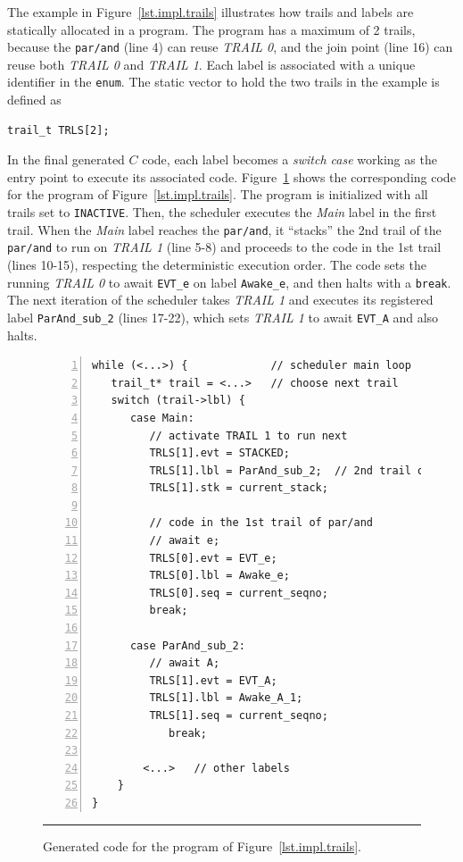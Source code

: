 \documentclass{sigplanconf}
\newcommand{\code}[1] {{\small{\texttt{#1}}}}
\newcommand{\1}{\;}
\newcommand{\2}{\;\;}
\newcommand{\3}{\;\;\;}
\newcommand{\5}{\;\;\;\;\;}
\begin{document}
The example in Figure~\ref{lst.impl.trails} illustrates how trails and labels 
are statically allocated in a program.
%
The program has a maximum of 2 trails, because the \code{par/and} (line 4) can 
reuse \emph{TRAIL 0}, and the join point (line 16) can reuse both \emph{TRAIL 
0} and \emph{TRAIL 1}.
%
Each label is associated with a unique identifier in the \code{enum}.
%
The static vector to hold the two trails in the example is defined as

\begin{lstlisting}
trail_t TRLS[2];
\end{lstlisting}

In the final generated $C$ code, each label becomes a \emph{switch case} 
working as the entry point to execute its associated code.
%
Figure~\ref{lst.impl.code} shows the corresponding code for the program of 
Figure~\ref{lst.impl.trails}.
%
The program is initialized with all trails set to \code{INACTIVE}.
Then, the scheduler executes the \emph{Main} label in the first trail.
%
When the \emph{Main} label reaches the \code{par/and}, it ``stacks'' the 2nd 
trail of the \code{par/and} to run on \emph{TRAIL 1} (line 5-8) and proceeds to 
the code in the 1st trail (lines 10-15), respecting the deterministic execution 
order.
%
The code sets the running \emph{TRAIL 0} to await \code{EVT\_e} on label 
\code{Awake\_e}, and then halts with a \code{break}.
%
The next iteration of the scheduler takes \emph{TRAIL 1} and executes its 
registered label \code{ParAnd\_sub\_2} (lines 17-22), which sets \emph{TRAIL 1} 
to await \code{EVT\_A} and also halts.


\begin{figure}[t]
\begin{lstlisting}[numbers=left,xleftmargin=2em]
while (<...>) {             // scheduler main loop
   trail_t* trail = <...>   // choose next trail
   switch (trail->lbl) {
      case Main:
         // activate TRAIL 1 to run next
         TRLS[1].evt = STACKED;
         TRLS[1].lbl = ParAnd_sub_2;  // 2nd trail of par/and
         TRLS[1].stk = current_stack;

         // code in the 1st trail of par/and
         // await e;
         TRLS[0].evt = EVT_e;
         TRLS[0].lbl = Awake_e;
         TRLS[0].seq = current_seqno;
         break;

      case ParAnd_sub_2:
         // await A;
         TRLS[1].evt = EVT_A;
         TRLS[1].lbl = Awake_A_1;
         TRLS[1].seq = current_seqno;
            break;

        <...>   // other labels
    }
}
\end{lstlisting}
\rule{14cm}{0.37pt}
\caption{
Generated code for the program of Figure~\ref{lst.impl.trails}.
\label{lst.impl.code}
}
\end{figure}
\end{document}
